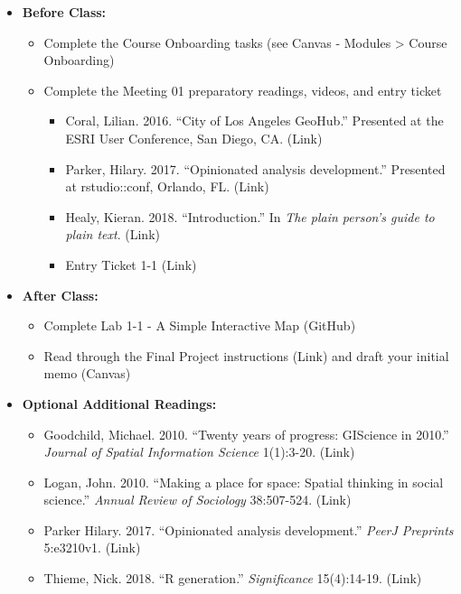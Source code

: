 \documentclass[
]{book}
\providecommand{\tightlist}{%
  \setlength{\itemsep}{0pt}\setlength{\parskip}{0pt}}
\begin{document}
\begin{itemize}
\tightlist
\item
  \textbf{Before Class:}

  \begin{itemize}
  \tightlist
  \item
    Complete the Course Onboarding tasks (see Canvas - Modules \textgreater{} Course Onboarding)
  \item
    Complete the Meeting 01 preparatory readings, videos, and entry ticket

    \begin{itemize}
    \tightlist
    \item
      Coral, Lilian. 2016. ``City of Los Angeles GeoHub.'' Presented at the ESRI User Conference, San Diego, CA. (Link)
    \item
      Parker, Hilary. 2017. ``Opinionated analysis development.'' Presented at rstudio::conf, Orlando, FL. (Link)
    \item
      Healy, Kieran. 2018. ``Introduction.'' In \emph{The plain person's guide to plain text}. (Link)
    \item
      Entry Ticket 1-1 (Link)
    \end{itemize}
  \end{itemize}
\item
  \textbf{After Class:}

  \begin{itemize}
  \tightlist
  \item
    Complete Lab 1-1 - A Simple Interactive Map (GitHub)
  \item
    Read through the Final Project instructions (Link) and draft your initial memo (Canvas)
  \end{itemize}
\item
  \textbf{Optional Additional Readings:}

  \begin{itemize}
  \tightlist
  \item
    Goodchild, Michael. 2010. ``Twenty years of progress: GIScience in 2010.'' \emph{Journal of Spatial Information Science} 1(1):3-20. (Link)
  \item
    Logan, John. 2010. ``Making a place for space: Spatial thinking in social science.'' \emph{Annual Review of Sociology} 38:507-524. (Link)
  \item
    Parker Hilary. 2017. ``Opinionated analysis development.'' \emph{PeerJ Preprints} 5:e3210v1. (Link)
  \item
    Thieme, Nick. 2018. ``R generation.'' \emph{Significance} 15(4):14-19. (Link)
  \end{itemize}
\end{itemize}
\end{document}
